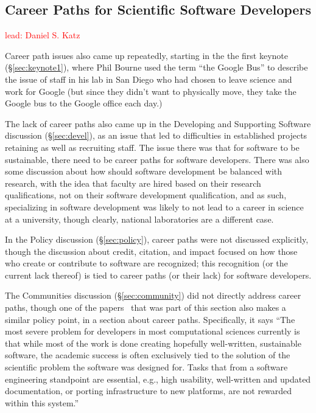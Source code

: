 \documentclass[11pt, oneside]{amsart}
\newcommand{\note}[1]{ {\textcolor{red}    { #1 }}}
\begin{document}
\subsection{Career Paths for Scientific Software Developers} \note{lead: Daniel S. Katz} \label{sec:career-tracks}

Career path issues also came up repeatedly, starting in the the first keynote (\S\ref{sec:keynote1}), where Phil Bourne used the term ``the Google Bus'' to describe the issue of staff in his lab in San Diego who had chosen to leave science and work for Google (but since they didn't want to physically move, they take the Google bus to the Google office each day.)

The lack of career paths also came up in the Developing and Supporting Software discussion (\S\ref{sec:devel}), as an issue that led to difficulties in established projects retaining as well as recruiting staff. The issue there was that for software to be sustainable, there need to be career paths for software developers.  There was also some discussion about how should software development be balanced with research, with the idea that faculty are hired based on their research qualifications, not on their software development qualification, and as such, specializing in software development was likely to not lead to a career in science at a university, though clearly, national laboratories are a different case.

In the Policy discussion (\S\ref{sec:policy}), career paths were not discussed explicitly, though the discussion about credit, citation, and impact focused on how those who create or contribute to software are recognized; this recognition (or the current lack thereof) is tied to career paths (or their lack) for software developers.

The Communities discussion (\S\ref{sec:community}) did not directly address career paths, though one of the papers~\cite{Loffler_WSSSPE} that was part of this section also makes a similar policy point, in a section about career paths. Specifically, it says ``The most severe problem for developers in most computational sciences currently is that while most of the work is done creating hopefully well-written, sustainable software, the academic success is often exclusively tied to the solution of the scientific problem the software was designed for. Tasks that from a software engineering standpoint are essential, e.g., high usability, well-written and updated documentation, or porting infrastructure to new platforms, are not rewarded within this system.''
\end{document}
